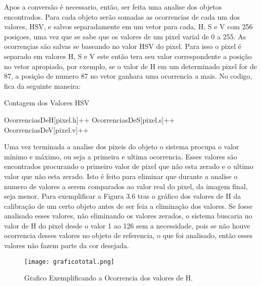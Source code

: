 Apos a conversão é necessario, então, ser feita uma analise dos objetos encontrados. Para cada objeto serão somadas as ocorrencias de cada um dos valores, HSV, e salvos separadamente em um vetor para cada, H, S e V com 256 posiçoes, uma vez que se sabe que os valores de um pixel varial de 0 a 255. As ocorrençias são salvas se baseando no valor HSV do pixel. Para isso o pixel é separado em valores H, S e V este então tera seu valor correspondente a posição no vetor apropiado, por exemplo, se o valor de H em um determinado pixel for de 87, a posição de numero 87 no vetor ganhara uma ocorrencia a mais. No codigo, fica da seguinte maneira:
	        
	        \begin{algorithm}
	       		 \caption{Contagem dos Valores HSV}
		        \begin{algorithmic}
		     	
		   				 \State OcorrenciasDeH[pixel.h]++ 
		    			 \State	OcorrenciasDeS[pixel.s]++ 
		     	  		 \State	OcorrenciasDeV[pixel.v]++
		     	   \EndFor
		     	\EndFor
		     		
		        \end{algorithmic}
	        
	        \end{algorithm}
	        
        
Uma vez terminada a analise dos pixeis do objeto o sistema procupa o valor mínimo e máximo, ou seja a primeira e ultima ocorrencia. Esses valores são encontrados procurando o primeiro valor de pixel que não esta zerado e o ultimo valor que não esta zerado. Isto é feito para eliminar que durante a analise o numero de valores a serem comparados ao valor real do pixel, da imagem final, seja menor. Para exemplificar a Figura 3.6 tras o gráfico dos valores de H da calibração de um certo objeto antes de ser feia a eliminação dos valores. Se fosse analisado esses valores, não eliminando os valores zerados, o sistema buscaria no valor de H do pixel desde o valor 1 ao 126 sem a necessidade, pois se não houve ocorrencia desses valores no objeto de referencia, o que foi analisado, então esses valores não fazem parte da cor desejada.

\begin{figure}[!h]
	\centering
	\texttt{[image: graficototal.png]}
	\caption{Grafico Exemplificando a Ocorrencia dos valores de H.}
	\label{Grafico Exemplo}
\end{figure}

